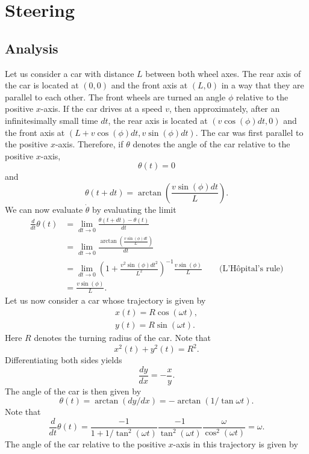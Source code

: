 \documentclass[11pt,titlepage]{report}
\begin{document}
\newcommand{\mat}[1]{\mathbf{#1}}

\chapter*{Steering}
\section*{Analysis}
Let us consider a car with distance $L$ between both wheel axes. The rear axis of the car is located at $(0,0)$ and the front axis at $(L,0)$ in a way that they are parallel to each other. The front wheels are turned an angle $\phi$ relative to the positive $x$-axis. If the car drives at a speed $v$, then approximately, after an infinitesimally small time $dt$, the rear axis is located at $(v \cos{(\phi)}dt,0)$ and the front axis at $(L+v \cos{(\phi)}dt,v \sin{(\phi)}dt)$. The car was first parallel to the positive $x$-axis. Therefore, if $\theta$ denotes the angle of the car relative to the positive $x$-axis,
\[
	\theta(t) = 0
\]
and
\[
	\theta(t+dt)=\arctan{\left(\frac{v \sin{(\phi)}dt}{L}\right)}.
\]
We can now evaluate $\dot{\theta}$ by evaluating the limit
\begin{align}
	\frac{d}{dt}\theta(t) &= \lim_{dt \rightarrow 0} \frac{\theta(t+dt)-\theta(t)}{dt} \nonumber \\
	&= \lim_{dt \rightarrow 0} \frac{\arctan{\left(\frac{v \sin{(\phi)}dt}{L}\right)}}{dt} \nonumber \\
	&= \lim_{dt \rightarrow 0} \left(1+\frac{v^2 \sin{(\phi)}dt^2}{L^2}\right)^{-1}\frac{v \sin{(\phi)}}{L} \quad \quad \text{(L'H\^opital's rule)} \nonumber \\
	&= \frac{v \sin{(\phi)}}{L}. \label{eq:steering-derivative}
\end{align}
Let us now consider a car whose trajectory is given by
\begin{align*}
	x(t) = R \cos{(\omega t)}, \\
	y(t) = R \sin{(\omega t)}.
\end{align*}
Here $R$ denotes the turning radius of the car. Note that
\[
	x^2(t)+y^2(t)=R^2.
\]
Differentiating both sides yields
\[
	\frac{dy}{dx}=-\frac{x}{y}.
\]
The angle of the car is then given by
\[
	\theta(t) = \arctan{(dy/dx)} = -\arctan{(1/\tan{\omega t})}.
\]
Note that
\[
	\frac{d}{dt} \theta(t) = \frac{-1}{1+1/\tan^2{(\omega t)}} \frac{-1}{\tan^2{(\omega t)}} \frac{\omega}{\cos^2{(\omega t)}} = \omega.
\]
The angle of the car relative to the positive $x$-axis in this trajectory is given by
\end{document}
